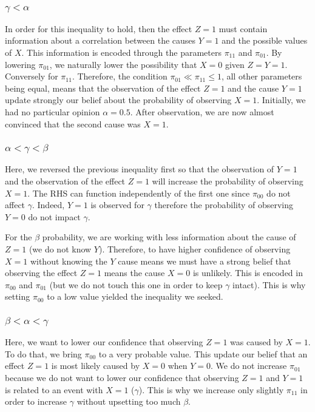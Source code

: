\documentclass{article}
\numberwithin{equation}{section}
\begin{document}
\subsection{}

\subsubsection{$\gamma < \alpha$}
In order for this inequality to hold, then the effect $Z = 1$ must contain information 
about a correlation between the causes $Y = 1$ and the possible values of $X$.
This information is encoded 
through the parameters $\pi_{11}$ and $\pi_{01}$. By lowering $\pi_{01}$, we 
naturally lower the possibility that $X = 0$ given $Z = Y = 1$. Conversely 
for $\pi_{11}$. Therefore, the condition $\pi_{01} \ll \pi_{11} \leq 1$, 
all other parameters being equal, means that the observation of the effect $Z = 1$ 
and the cause $Y = 1$ update strongly our belief about the probability of observing $X = 1$. 
Initially, we had no particular opinion $\alpha = 0.5$. After observation, we are now 
almost convinced that the second cause was $X = 1$.


\subsubsection{$\alpha < \gamma < \beta$}
Here, we reversed the previous inequality first so that the observation of $Y = 1$ 
and the observation of the effect $Z = 1$ will increase the probability of observing 
$X = 1$. The RHS can function independently of the first one since $\pi_{00}$ 
do not affect $\gamma$. Indeed, $Y = 1$ is observed for $\gamma$ therefore
the probability 
of observing $Y = 0$ do not impact $\gamma$. \par
For the $\beta$ probability, we are working with less information about the cause 
of $Z = 1$ (we do not know $Y$). Therefore, to have higher confidence of observing 
$X = 1$ without knowing the $Y$ cause means we must have a strong belief that 
observing the effect $Z = 1$ means the cause $X = 0$ is unlikely. 
This is encoded in $\pi_{00}$
and $\pi_{01}$ (but we do not touch this one in order to keep $\gamma$ intact).
This is why setting $\pi_{00}$ to a low value yielded the inequality we seeked.

\subsubsection{$\beta < \alpha < \gamma$}
Here, we want to lower our confidence that observing $Z = 1$ was caused by 
$X = 1$. To do that, we bring $\pi_{00}$ to a very probable value. This 
update our belief that an effect $Z = 1$ is most likely caused by $X = 0$ when 
$Y = 0$. We do not increase $\pi_{01}$ because we do not want to lower our 
confidence that observing $Z = 1$ and $Y = 1$ is related to an event with 
$X = 1$ ($\gamma$). This is why we increase only slightly $\pi_{11}$ in order to 
increase $\gamma$ without upsetting too much $\beta$. 
\end{document}

